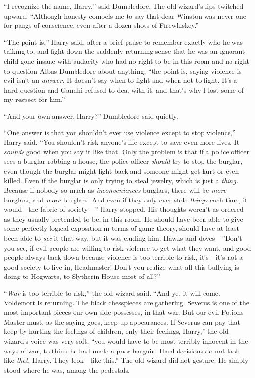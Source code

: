 “I recognize the name, Harry,” said Dumbledore. The old wizard’s lips twitched
upward. “Although honesty compels me to say that dear Winston was never one for
pangs of conscience, even after a dozen shots of Firewhiskey.”

“The point is,” Harry said, after a brief pause to remember exactly who he was
talking to, and fight down the suddenly returning sense that he was an ignorant
child gone insane with audacity who had no right to be in this room and no
right to question Albus Dumbledore about anything, “the point is, saying
violence is evil isn’t an \emph{answer.} It doesn’t say when to fight and when
not to fight. It’s a hard question and Gandhi refused to deal with it, and
that’s why I lost some of my respect for him.”

“And your own answer, Harry?” Dumbledore said quietly.

“One answer is that you shouldn’t ever use violence except to stop violence,”
Harry said. “You shouldn’t risk anyone’s life except to save even more lives.
It \emph{sounds} good when you say it like that. Only the problem is that if a
police officer sees a burglar robbing a house, the police officer \emph{should}
try to stop the burglar, even though the burglar might fight back and someone
might get hurt or even killed. Even if the burglar is only trying to steal
jewelry, which is just a \emph{thing.} Because if nobody so much as
\emph{inconveniences} burglars, there will be \emph{more} burglars, and
\emph{more} burglars. And even if they only ever stole \emph{things} each time,
it would—the fabric of society—” Harry stopped. His thoughts weren’t as
ordered as they usually pretended to be, in this room. He should have been able
to give some perfectly logical exposition in terms of game theory, should have
at least been able to \emph{see} it that way, but it was eluding him. Hawks and
doves—”Don’t you see, if evil people are willing to risk violence to get what
they want, and good people always back down because violence is too terrible to
risk, it’s—it’s not a good society to live in, Headmaster! Don’t you realize
what all this bullying is doing to Hogwarts, to Slytherin House most of all?”

“\emph{War} is too terrible to risk,” the old wizard said. “And yet it will
come. Voldemort is returning. The black chesspieces are gathering. Severus is
one of the most important pieces our own side possesses, in that war. But our
evil Potions Master must, as the saying goes, keep up appearances. If Severus
can pay that keep by hurting the feelings of children, only their feelings,
Harry,” the old wizard’s voice was very soft, “you would have to be most
terribly innocent in the ways of war, to think he had made a poor bargain. Hard
decisions do not look like \emph{that}, Harry. They look—like this.” The old
wizard did not gesture. He simply stood where he was, among the pedestals.


